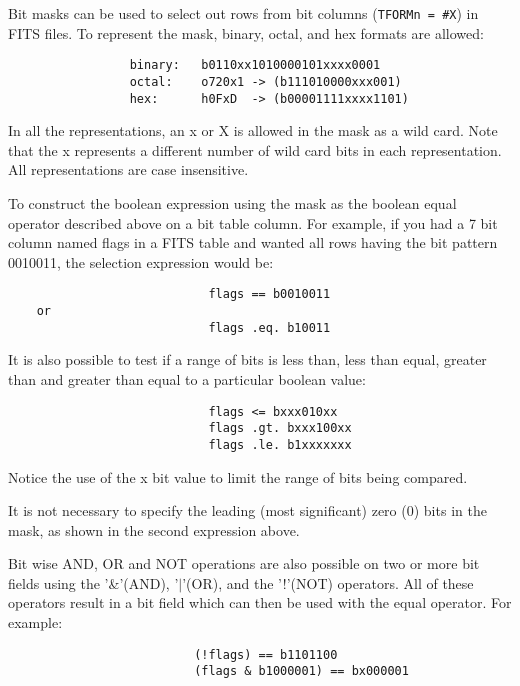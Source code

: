 \documentclass[11pt]{article}
\begin{document}
Bit  masks can be used to select out rows from bit columns ({\tt TFORMn =
\#X}) in FITS files. To represent the mask,  binary,  octal,  and  hex
formats are allowed:
 
\begin{verbatim}
                 binary:   b0110xx1010000101xxxx0001
                 octal:    o720x1 -> (b111010000xxx001)
                 hex:      h0FxD  -> (b00001111xxxx1101)
\end{verbatim}

In  all  the  representations, an x or X is allowed in the mask as a
wild card. Note that the x represents a  different  number  of  wild
card  bits  in  each  representation.  All  representations are case
insensitive.

To construct the boolean expression using the mask  as  the  boolean
equal  operator  described above on a bit table column. For example,
if you had a 7 bit column named flags in a  FITS  table  and  wanted
all  rows  having  the bit pattern 0010011, the selection expression
would be:

 
\begin{verbatim}
                            flags == b0010011
    or
                            flags .eq. b10011
\end{verbatim}

It is also possible to test if a range of bits is  less  than,  less
than  equal,  greater  than  and  greater than equal to a particular
boolean value:

 
\begin{verbatim}
                            flags <= bxxx010xx
                            flags .gt. bxxx100xx
                            flags .le. b1xxxxxxx
\end{verbatim}

Notice the use of the x bit value to limit the range of  bits  being
compared.

It  is  not necessary to specify the leading (most significant) zero
(0) bits in the mask, as shown in the second expression above.

Bit wise AND, OR and NOT operations are  also  possible  on  two  or
more  bit  fields  using  the  '\&'(AND),  '$|$'(OR),  and the '!'(NOT)
operators. All of these operators result in a bit  field  which  can
then be used with the equal operator. For example:

 
\begin{verbatim}
                          (!flags) == b1101100
                          (flags & b1000001) == bx000001
\end{verbatim}
\end{document}
